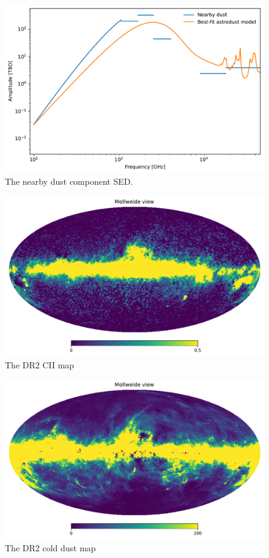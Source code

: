\documentclass{aa}
\begin{document}
\begin{figure}
  \centering
  \includegraphics[width=\columnwidth]{figures/nearby_dust_sed.pdf}
  \caption{The nearby dust component SED.}
  \label{fig:nearby_dust_sed}
\end{figure}
\begin{figure}
  \centering
  \includegraphics[width=\columnwidth]{figures/cii_DR2.pdf}
  \caption{The DR2 CII map}
  \label{fig:cii_DR2}
\end{figure}
\begin{figure}
  \centering
  \includegraphics[width=\columnwidth]{figures/cold_dust.pdf}
  \caption{The DR2 cold dust map}
  \label{fig:cold_dust}
\end{figure}
\end{document}
